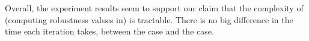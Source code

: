 \documentclass[envcountsect,orivec]{llncs} \usepackage{etex} \usepackage[]{graphicx}
\begin{document}
Overall, the experiment results seem to support our claim that the complexity of
(computing robustness values in)  is tractable. There is no big
difference in the time 
each iteration takes, between the  case and the  case.
\end{document}

